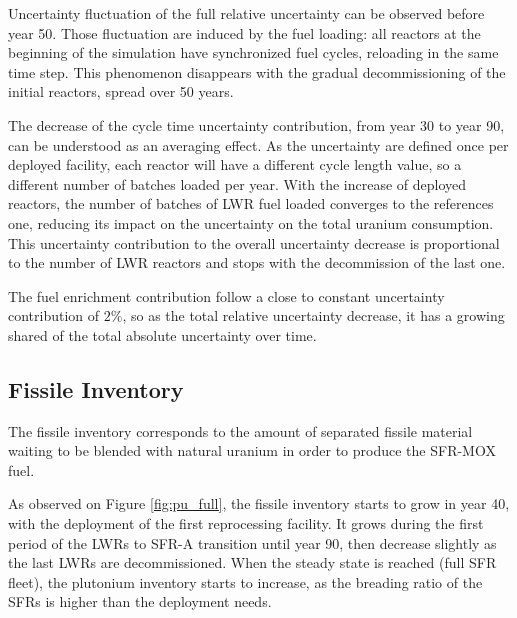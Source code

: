 \documentclass{anstrans}
\begin{document}
Uncertainty fluctuation of the full relative uncertainty can be observed before
year 50.  Those fluctuation are induced by the fuel loading: all reactors at the
beginning of the simulation have synchronized fuel cycles, reloading in the same
time step.  This phenomenon disappears with the gradual decommissioning of the
initial reactors, spread over 50 years.

The decrease of the cycle time uncertainty contribution, from year 30 to year
90, can be understood as an averaging effect.  As the uncertainty are defined
once per deployed facility, each reactor will have a different cycle length
value, so a different number of batches loaded per year.  With the increase of
deployed reactors, the number of batches of \gls{LWR} fuel loaded converges to
the references one, reducing its impact on the uncertainty on the total uranium
consumption. This uncertainty contribution to the overall uncertainty decrease
is proportional to the number of \gls{LWR} reactors and stops with the
decommission of the last one.

The fuel enrichment contribution follow a close to constant uncertainty
contribution of $2\%$, so as the total relative uncertainty decrease, it has a
growing shared of the total absolute uncertainty over time.


\subsection{Fissile Inventory}

The fissile inventory corresponds to the amount of separated fissile material
waiting to be blended with natural uranium in order to produce the
\gls{SFR}-\gls{MOX} fuel.

As observed on Figure \ref{fig:pu_full}, the fissile inventory starts to grow in
year 40, with the deployment of the first reprocessing facility.  It grows
during the first period of the \glspl{LWR} to \gls{SFR}-A transition until year
90, then decrease slightly as the last \glspl{LWR} are decommissioned.  When the
steady state is reached (full \gls{SFR} fleet), the plutonium inventory starts
to increase, as the breading ratio of the \glspl{SFR} is higher than the
deployment needs.
\end{document}
